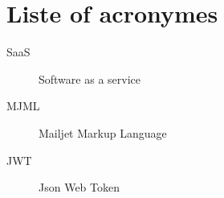 \chapter*{Liste of acronymes}

\begin{description}
\item[SaaS] Software as a service
\item[MJML] Mailjet Markup Language
\item[JWT] Json Web Token 
\end{description}